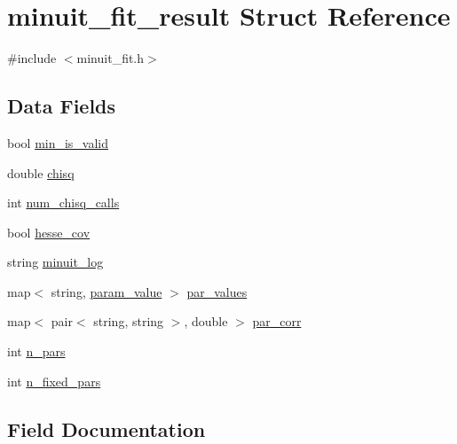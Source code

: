 \hypertarget{structminuit__fit__result}{}\section{minuit\+\_\+fit\+\_\+result Struct Reference}
\label{structminuit__fit__result}


{\ttfamily \#include $<$minuit\+\_\+fit.\+h$>$}

\subsection*{Data Fields}
\begin{DoxyCompactItemize}
\item 
bool \mbox{\hyperlink{structminuit__fit__result_accc27821be9fa359abaa494f1e92bc98}{min\+\_\+is\+\_\+valid}}
\item 
double \mbox{\hyperlink{structminuit__fit__result_a44ab3e18735aeb6226a9e182b6039920}{chisq}}
\item 
int \mbox{\hyperlink{structminuit__fit__result_a83f32419135a0b919dd40dcdf0733e8a}{num\+\_\+chisq\+\_\+calls}}
\item 
bool \mbox{\hyperlink{structminuit__fit__result_ac9845c3b92a070e80645187634a5304c}{hesse\+\_\+cov}}
\item 
string \mbox{\hyperlink{structminuit__fit__result_ad24097d1a2c5d27e1b82159f0f26cd5e}{minuit\+\_\+log}}
\item 
map$<$ string, \mbox{\hyperlink{structparam__value}{param\+\_\+value}} $>$ \mbox{\hyperlink{structminuit__fit__result_a798128e058df3dd530688e2d2038fcb9}{par\+\_\+values}}
\item 
map$<$ pair$<$ string, string $>$, double $>$ \mbox{\hyperlink{structminuit__fit__result_ac3d69b03a0dd160c3f94cd04207c7fac}{par\+\_\+corr}}
\item 
int \mbox{\hyperlink{structminuit__fit__result_ad354d3db663e564286ac7bf58c9422ac}{n\+\_\+pars}}
\item 
int \mbox{\hyperlink{structminuit__fit__result_ae9004210419586c13f124c6897e3ee7a}{n\+\_\+fixed\+\_\+pars}}
\end{DoxyCompactItemize}


\subsection{Field Documentation}
\mbox{\label{structminuit__fit__result_a44ab3e18735aeb6226a9e182b6039920}} 
